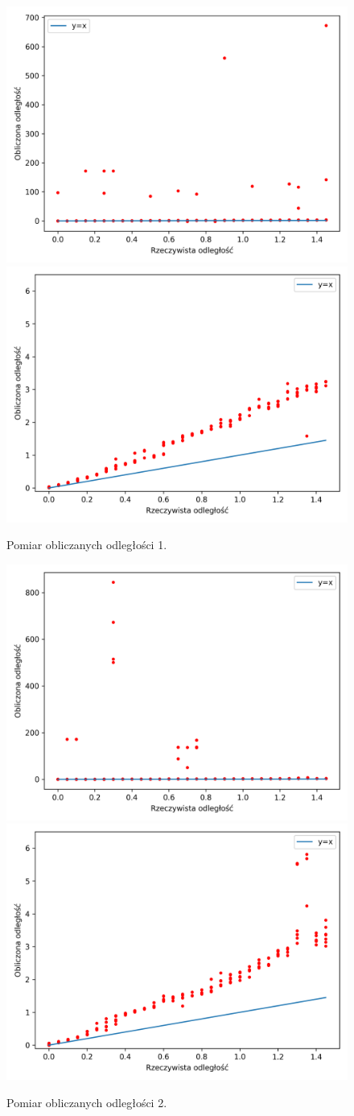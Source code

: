 \begin{figure}[h]
\centering
    \includegraphics[width=.49\textwidth]{pics/mic_sync_dist/dists_long_0.png}
    \includegraphics[width=.49\textwidth]{pics/mic_sync_dist/dists_close_long_0.png}
\caption{Pomiar obliczanych odległości 1.}
\label{pic:slope_test_0}
\end{figure}

\begin{figure}[h]
\centering
    \includegraphics[width=.49\textwidth]{pics/mic_sync_dist/dists_long_1.png}
    \includegraphics[width=.49\textwidth]{pics/mic_sync_dist/dists_close_long_1.png}
\caption{Pomiar obliczanych odległości 2.}
\label{pic:slope_test_1}
\end{figure}

